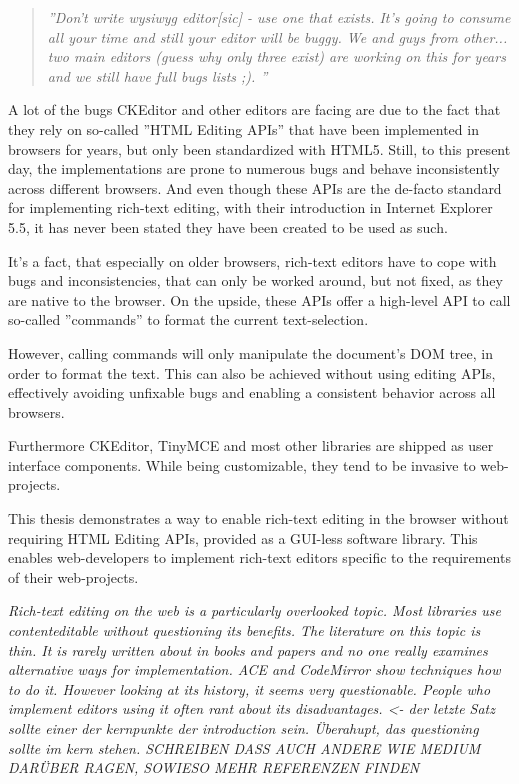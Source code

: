 \begin{quotation}
\textit{''Don't write wysiwyg editor[sic] - use one that exists. It's going to consume all your time and still your editor will be buggy. We and guys from other... two main editors (guess why only three exist) are working on this for years and we still have full bugs lists ;). \cite{sopp}''}
\end{quotation} %

A lot of the bugs CKEditor and other editors are facing are due to the fact that they rely on so-called ''HTML Editing APIs'' that have been implemented in browsers for years, but only been standardized with HTML5. Still, to this present day, the implementations are prone to numerous bugs and behave inconsistently across different browsers. And even though these APIs are the de-facto standard for implementing rich-text editing, with their introduction in Internet Explorer 5.5, it has never been stated they have been created to be used as such.

It's a fact, that especially on older browsers, rich-text editors have to cope with bugs and inconsistencies, that can only be worked around, but not fixed, as they are native to the browser. On the upside, these APIs offer a high-level API to call so-called ''commands'' to format the current text-selection. 

However, calling commands will only manipulate the document's DOM tree, in order to format the text. This can also be achieved without using editing APIs, effectively avoiding unfixable bugs and enabling a consistent behavior across all browsers.

Furthermore CKEditor, TinyMCE and most other libraries are shipped as user interface components. While being customizable, they tend to be invasive to web-projects.

This thesis demonstrates a way to enable rich-text editing in the browser without requiring HTML Editing APIs, provided as a GUI-less software library. This enables web-developers to implement rich-text editors specific to the requirements of their web-projects.

\textit{Rich-text editing on the web is a particularly overlooked topic. Most libraries use contenteditable without questioning its benefits. The literature on this topic is thin. It is rarely written about in books and papers and no one really examines alternative ways for implementation. ACE and CodeMirror show techniques how to do it. However looking at its history, it seems very questionable. People who implement editors using it often rant about its disadvantages. <- der letzte Satz sollte einer der kernpunkte der introduction sein. Überahupt, das questioning sollte im kern stehen. SCHREIBEN DASS AUCH ANDERE WIE MEDIUM DARÜBER RAGEN, SOWIESO MEHR REFERENZEN FINDEN}


